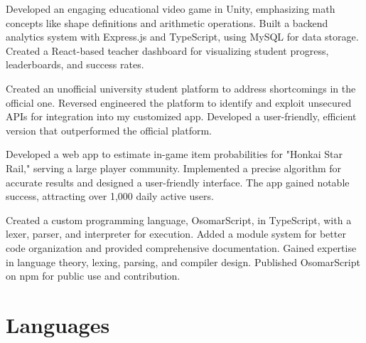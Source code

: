 \documentclass[11pt,a4paper,SF Pro Disp]{moderncv}   %
\begin{document}
\vspace{1em}
{Developed an engaging educational video game in Unity, emphasizing math concepts like shape definitions and arithmetic operations. Built a backend analytics system with Express.js and TypeScript, using MySQL for data storage. Created a React-based teacher dashboard for visualizing student progress, leaderboards, and success rates.}


\vspace{1em}
{Created an unofficial university student platform to address shortcomings in the official one. Reversed engineered the platform to identify and exploit unsecured APIs for integration into my customized app. Developed a user-friendly, efficient version that outperformed the official platform.}

\vspace{1em}
{Developed a web app to estimate in-game item probabilities for "Honkai Star Rail," serving a large player community. Implemented a precise algorithm for accurate results and designed a user-friendly interface. The app gained notable success, attracting over 1,000 daily active users.}


\vspace{1em}
{Created a custom programming language, OsomarScript, in TypeScript, with a lexer, parser, and interpreter for execution. Added a module system for better code organization and provided comprehensive documentation. Gained expertise in language theory, lexing, parsing, and compiler design. Published OsomarScript on npm for public use and contribution.}



\section{Languages}
\end{document}
